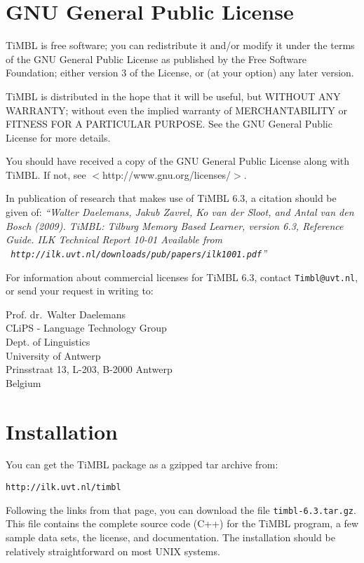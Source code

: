 \documentclass{report}
\begin{document}
\chapter{GNU General Public License}
\label{license}

TiMBL is free software; you can redistribute it and/or modify it under the terms of the GNU General Public License as published by the Free Software Foundation; either version 3 of the License, or (at your option) any later version.

TiMBL is distributed in the hope that it will be useful, but WITHOUT ANY WARRANTY; without even the implied warranty of MERCHANTABILITY or FITNESS FOR A PARTICULAR PURPOSE.  See the GNU General Public License for more details.

You should have received a copy of the GNU General Public License along with TiMBL.  If not, see $<$http://www.gnu.org/licenses/$>$.

In publication of research that makes use of TiMBL 6.3, a citation should be given of: {\em ``Walter Daelemans, Jakub Zavrel, Ko van der
  Sloot, and Antal van den Bosch (2009). TiMBL: Tilburg Memory Based
  Learner, version 6.3, Reference Guide. ILK Technical Report 10-01
  Available from \\ {\tt
    http://ilk.uvt.nl/downloads/pub/papers/ilk1001.pdf}''}

For information about commercial licenses for TiMBL 6.3,
contact {\tt Timbl@uvt.nl}, or send your request in writing to:

Prof. dr.~Walter Daelemans\\
CLiPS - Language Technology Group\\
Dept. of Linguistics \\
University of Antwerp\\
Prinsstraat 13, L-203, B-2000 Antwerp \\
Belgium

\pagestyle{headings}

\chapter{Installation}
\vspace{-1cm}
You can get the TiMBL package as a gzipped tar archive from:

{\tt http://ilk.uvt.nl/timbl}

Following the links from that page, you can download the file {\tt timbl-6.3.tar.gz}. This file contains the complete source code (C++) for the TiMBL program, a few sample data sets, the license, and documentation. The installation should be relatively straightforward on most UNIX systems.
\end{document}
